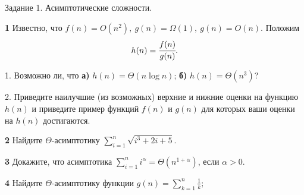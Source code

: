 \documentclass{article}
\begin{document}
\begin{center}
\Large {Задание 1. Асимптотические сложности.}
\end{center}

\bigskip

\textbf{1} Известно, что $f(n) = O(n^2),\ g(n) = \Omega(1),\ g(n) = O(n)$. Положим $$h(n) = \cfrac{f(n)}{g(n)}.$$ 

1. Возможно ли, что \textbf{а)} $h(n) = \Theta(n\log n)$; \textbf{б)} $h(n) = \Theta(n^3)$?

2. Приведите наилучшие (из возможных) верхние и нижние оценки на функцию $h(n)$ и приведите пример функций $f(n)$ и $g(n)$ для которых ваши оценки на $h(n)$ достигаются.

\medskip

\textbf{2} Найдите $\Theta$-асимптотику $\sum\limits_{i=1}^n \sqrt{i^3+2i+5}$.

\medskip

\textbf{3} Докажите, что асимптотика $\sum^n_{i=1} i^{\alpha}
= \Theta(n^{1+\alpha})$, если
$\alpha > 0$.

\medskip

\textbf{4} Найдите $\Theta$-асимптотику функции
$g(n) = \sum ^n_{k=1} \frac{1}{k};$

\medskip
\end{document}
